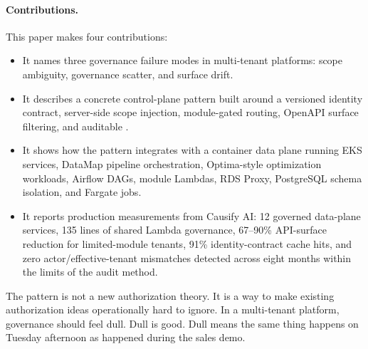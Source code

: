 \paragraph{Contributions.}
This paper makes four contributions:

\begin{itemize}
  \item It names three governance failure modes in multi-tenant platforms: scope ambiguity, governance scatter, and surface drift.
  \item It describes a concrete control-plane pattern built around a versioned identity contract, server-side scope injection, module-gated routing, OpenAPI surface filtering, and auditable \viewas{}.
  \item It shows how the pattern integrates with a container data plane running EKS services, DataMap pipeline orchestration, Optima-style optimization workloads, Airflow DAGs, module Lambdas, RDS Proxy, PostgreSQL schema isolation, and Fargate jobs.
  \item It reports production measurements from Causify AI: 12 governed data-plane services, 135 lines of shared Lambda governance, 67--90\% API-surface reduction for limited-module tenants, 91\% identity-contract cache hits, and zero actor/effective-tenant mismatches detected across eight months within the limits of the audit method.
\end{itemize}

The pattern is not a new authorization theory. It is a way to make existing authorization ideas operationally hard to ignore. In a multi-tenant platform, governance should feel dull. Dull is good. Dull means the same thing happens on Tuesday afternoon as happened during the sales demo.
